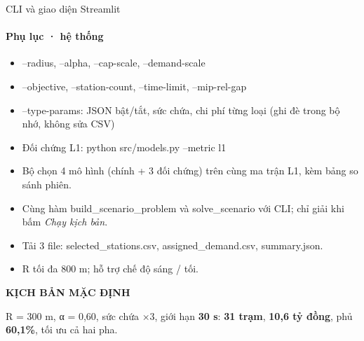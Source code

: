 \documentclass[aspectratio=169, 10pt, t, xcolor=table]{beamer}
\newcommand{\Feyebrow}{\fontsize{6}{7.5}\selectfont\bfseries\addfontfeature{LetterSpace=8.0}}
\newcommand{\Flead}{\fontsize{8}{11}\selectfont}
\newcommand{\code}[1]{{\ttfamily #1}}
\newcommand{\slidefoot}{}
\newcommand{\sfoot}[1]{\gdef\slidefoot{#1}}
\newenvironment{bul}[1][1.3mm]{\begin{itemize}\setlength{\itemsep}{#1}}{\end{itemize}}
\begin{document}
\sfoot{Phụ lục · Mã thoát CLI: 0 giải được và kiểm định đạt; 1 bất khả thi; 2 lỗi đầu vào; 3 lỗi solver hoặc kiểm định}
\begin{frame}{CLI và giao diện Streamlit}
  \framesubtitle{Phụ lục · hệ thống}
  \vspace{-1mm}
  \begin{tcbraster}[raster columns=2, raster column skip=4mm]
    \begin{card}[top=2.0mm, bottom=2.0mm, title={CLI: \code{python -m src.run}}]
      \begin{bul}[0.8mm]
        \item \code{--radius}, \code{--alpha}, \code{--cap-scale}, \code{--demand-scale}
        \item \code{--objective}, \code{--station-count}, \code{--time-limit}, \code{--mip-rel-gap}
        \item \code{--type-params}: JSON bật/tắt, sức chứa, chi phí từng loại (ghi đè trong bộ nhớ,
              không sửa CSV)
        \item Đối chứng L1: \code{python src/models.py --metric l1}
      \end{bul}
    \end{card}
    \begin{card}[top=2.0mm, bottom=2.0mm, title={Giao diện: \code{streamlit run app.py}}]
      \begin{bul}[0.8mm]
        \item Bộ chọn 4 mô hình (chính + 3 đối chứng) trên cùng ma trận L1, kèm bảng so sánh phiên.
        \item Cùng hàm \code{build\_scenario\_problem} và \code{solve\_scenario} với CLI; chỉ giải khi bấm \emph{Chạy kịch bản}.
        \item Tải 3 file: \code{selected\_stations.csv}, \code{assigned\_demand.csv}, \code{summary.json}.
        \item R tối đa 800 m; hỗ trợ chế độ sáng / tối.
      \end{bul}
    \end{card}
  \end{tcbraster}
  \vspace{2.2mm}
  \begin{tcolorbox}[cardbase, colback=brand, colframe=brand, top=2.2mm, bottom=2.2mm]
    \begin{minipage}[c]{34mm}\Feyebrow\color{peach}KỊCH BẢN MẶC ĐỊNH\end{minipage}%
    \begin{minipage}[c]{\dimexpr\linewidth-34mm}\Flead\color{paper}
      R = 300 m, α = 0,60, sức chứa ×3, giới hạn \textbf{30 s}: \textbf{31 trạm}, \textbf{10,6 tỷ đồng},
      phủ \textbf{60,1\%}, tối ưu cả hai pha.
    \end{minipage}
  \end{tcolorbox}
\end{frame}
\end{document}
